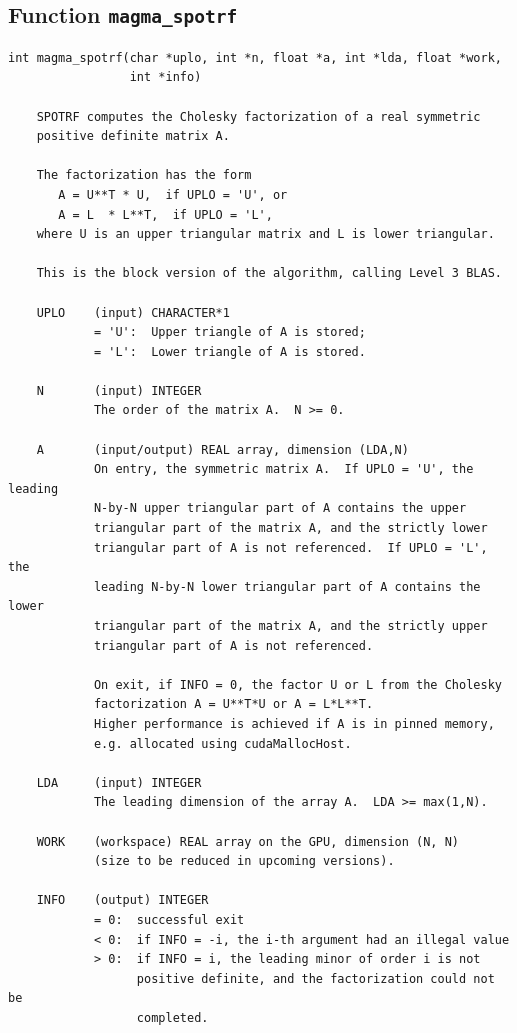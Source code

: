 \documentclass[10pt]{book}
\begin{document}
\subsection{Function {\tt {\bf magma\_spotrf}}}
\begin{verbatim}
int magma_spotrf(char *uplo, int *n, float *a, int *lda, float *work, 
                 int *info)
   
    SPOTRF computes the Cholesky factorization of a real symmetric   
    positive definite matrix A.   

    The factorization has the form   
       A = U**T * U,  if UPLO = 'U', or   
       A = L  * L**T,  if UPLO = 'L',   
    where U is an upper triangular matrix and L is lower triangular.   

    This is the block version of the algorithm, calling Level 3 BLAS.   

    UPLO    (input) CHARACTER*1   
            = 'U':  Upper triangle of A is stored;   
            = 'L':  Lower triangle of A is stored.   

    N       (input) INTEGER   
            The order of the matrix A.  N >= 0.   

    A       (input/output) REAL array, dimension (LDA,N)   
            On entry, the symmetric matrix A.  If UPLO = 'U', the leading   
            N-by-N upper triangular part of A contains the upper   
            triangular part of the matrix A, and the strictly lower   
            triangular part of A is not referenced.  If UPLO = 'L', the   
            leading N-by-N lower triangular part of A contains the lower   
            triangular part of the matrix A, and the strictly upper   
            triangular part of A is not referenced.   

            On exit, if INFO = 0, the factor U or L from the Cholesky   
            factorization A = U**T*U or A = L*L**T.   
            Higher performance is achieved if A is in pinned memory, 
            e.g. allocated using cudaMallocHost.

    LDA     (input) INTEGER   
            The leading dimension of the array A.  LDA >= max(1,N).   

    WORK    (workspace) REAL array on the GPU, dimension (N, N)
            (size to be reduced in upcoming versions).

    INFO    (output) INTEGER   
            = 0:  successful exit   
            < 0:  if INFO = -i, the i-th argument had an illegal value   
            > 0:  if INFO = i, the leading minor of order i is not   
                  positive definite, and the factorization could not be   
                  completed.   
\end{verbatim}
\end{document}
